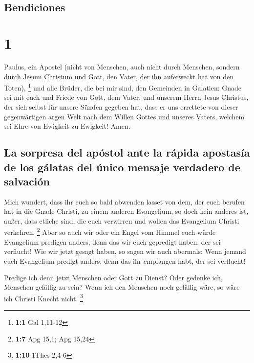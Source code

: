 \hypertarget{bendiciones}{%
\subsection{Bendiciones}\label{bendiciones}}

\hypertarget{section}{%
\section{1}\label{section}}

 Paulus, ein Apostel (nicht von Menschen, auch nicht durch
Menschen, sondern durch Jesum Christum und Gott, den Vater, der ihn
auferweckt hat von den Toten), \footnote{\textbf{1:1} Gal 1,11-12}
 und alle Brüder, die bei mir sind, den Gemeinden in
Galatien:  Gnade sei mit euch und Friede von Gott, dem
Vater, und unserem Herrn Jesus Christus,  der sich selbst
für unsere Sünden gegeben hat, dass er uns errettete von dieser
gegenwärtigen argen Welt nach dem Willen Gottes und unseres Vaters,
 welchem sei Ehre von Ewigkeit zu Ewigkeit! Amen.

\hypertarget{la-sorpresa-del-apuxf3stol-ante-la-ruxe1pida-apostasuxeda-de-los-guxe1latas-del-uxfanico-mensaje-verdadero-de-salvaciuxf3n}{%
\subsection{La sorpresa del apóstol ante la rápida apostasía de los
gálatas del único mensaje verdadero de
salvación}\label{la-sorpresa-del-apuxf3stol-ante-la-ruxe1pida-apostasuxeda-de-los-guxe1latas-del-uxfanico-mensaje-verdadero-de-salvaciuxf3n}}

 Mich wundert, dass ihr euch so bald abwenden lasset von
dem, der euch berufen hat in die Gnade Christi, zu einem anderen
Evangelium,  so doch kein anderes ist, außer, dass etliche
sind, die euch verwirren und wollen das Evangelium Christi verkehren.
\footnote{\textbf{1:7} Apg 15,1; Apg 15,24}  Aber so auch
wir oder ein Engel vom Himmel euch würde Evangelium predigen anders,
denn das wir euch gepredigt haben, der sei verflucht!  Wie
wir jetzt gesagt haben, so sagen wir auch abermals: Wenn jemand euch
Evangelium predigt anders, denn das ihr empfangen habt, der sei
verflucht!

 Predige ich denn jetzt Menschen oder Gott zu Dienst?
Oder gedenke ich, Menschen gefällig zu sein? Wenn ich den Menschen noch
gefällig wäre, so wäre ich Christi Knecht nicht. \footnote{\textbf{1:10}
  1Thes 2,4-6}

